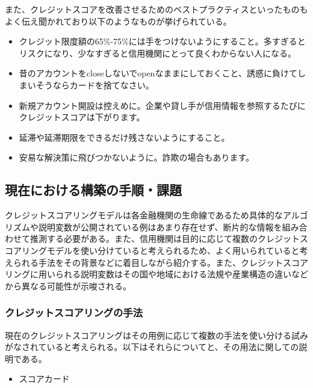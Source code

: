 \documentclass[11pt]{jsarticle}
\providecommand{\tightlist}{%
      \setlength{\itemsep}{0pt}\setlength{\parskip}{0pt}}
\begin{document}
また、クレジットスコアを改善させるためのベストプラクティスといったものもよく伝え聞かれており以下のようなものが挙げられている。

\begin{itemize}
\tightlist
\item
  クレジット限度額の65\%-75\%には手をつけないようにすること。多すぎるとリスクになり、少なすぎると信用機関にとって良くわからない人になる。
\item
  昔のアカウントをcloseしないでopenなままにしておくこと、誘惑に負けてしまいそうならカードを捨てなさい。
\item
  新規アカウント開設は控えめに。企業や貸し手が信用情報を参照するたびにクレジットスコアは下がります。
\item
  延滞や延滞期限をできるだけ残さないようにすること。
\item
  安易な解決策に飛びつかないように。詐欺の場合もあります。
\end{itemize}

    \subsection{現在における構築の手順・課題}\label{ux73feux5728ux306bux304aux3051ux308bux69cbux7bc9ux306eux624bux9806ux8ab2ux984c}

    クレジットスコアリングモデルは各金融機関の生命線であるため具体的なアルゴリズムや説明変数が公開されている例はあまり存在せず、断片的な情報を組み合わせて推測する必要がある。また、信用機関は目的に応じて複数のクレジットスコアリングモデルを使い分けていると考えられるため\cite{fujitsu}、よく用いられていると考えられる手法をその背景などに着目しながら紹介する。また、クレジットスコアリングに用いられる説明変数はその国や地域における法規や産業構造の違いなどから異なる可能性が示唆される\cite{kirill}。

    \subsubsection{クレジットスコアリングの手法}\label{ux30afux30ecux30b8ux30c3ux30c8ux30b9ux30b3ux30a2ux30eaux30f3ux30b0ux306eux624bux6cd5}

    現在のクレジットスコアリングはその用例に応じて複数の手法を使い分ける試みがなされていると考えられる\cite{fujitsu}。以下はそれらについてと、その用法に関しての説明である。

\begin{itemize}
\tightlist
\item
  スコアカード
\end{itemize}
\end{document}
